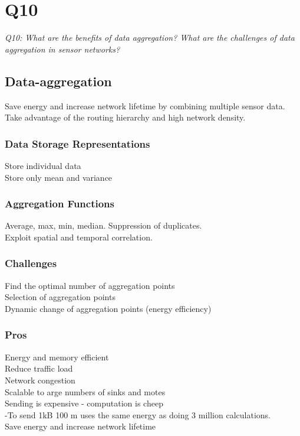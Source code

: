 \chapter{Q10}
\emph{Q10: What are the benefits of data aggregation? What are the challenges
of data aggregation in sensor networks?}

\section{Data-aggregation}
Save energy and increase network lifetime by combining multiple sensor data.
\\
Take advantage of the routing hierarchy and high network density.

\subsection{Data Storage Representations}
Store individual data
\\
Store only mean and variance

\subsection{Aggregation Functions}
Average, max, min, median.
Suppression of duplicates.
\\
Exploit spatial and temporal correlation.

\subsection{Challenges}
Find the optimal number of aggregation points
\\
Selection of aggregation points
\\
Dynamic change of aggregation points (energy efficiency)

\subsection{Pros}
Energy and memory efficient
\\
Reduce traffic load
\\
Network congestion
\\
Scalable to arge numbers of sinks and motes
\\
Sending is expensive - computation is cheep
\\
-To send 1kB 100 m uses the same energy as doing 3 million calculations.
\\
Save energy and increase network lifetime


